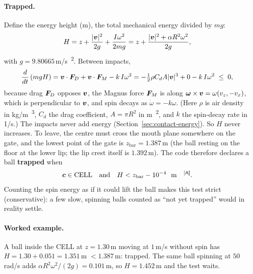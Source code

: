 \paragraph{Trapped.}
Define the energy height (\unit{m}), the total mechanical energy divided by $mg$:
\begin{equation}
  H = z + \frac{|\bm{v}|^2}{2g} + \frac{I\omega^2}{2mg}
    = z + \frac{|\bm{v}|^2 + \alpha R^2\omega^2}{2g},
  \label{eq:contact-energy-height}
\end{equation}
with $g=9.80665$\,\unit{m/s\textsuperscript{2}}\confirmed. Between impacts,
\begin{equation}
  \frac{d}{dt}\left(mgH\right)
  = \bm{v}\cdot\bm{F}_D + \bm{v}\cdot\bm{F}_M - k\,I\omega^2
  = -\tfrac12\rho C_d A|\bm{v}|^3 + 0 - k\,I\omega^2 \;\le\; 0,
  \label{eq:contact-dEdt}
\end{equation}
because drag $\bm{F}_D$ opposes $\bm{v}$, the Magnus force $\bm{F}_M$ is along
$\bm{\omega}\times\bm{v}=\omega(v_z,-v_x)$, which is perpendicular to $\bm{v}$, and spin
decays as $\dot\omega=-k\omega$. (Here $\rho$ is air density in \unit{kg/m\textsuperscript{3}},
$C_d$ the drag coefficient, $A=\pi R^2$ in \unit{m\textsuperscript{2}}, and $k$ the spin-decay
rate in \unit{1/s}.) The impacts never add energy (Section~\ref{sec:contact-energy}). So $H$
never increases. To leave, the centre must cross the mouth plane somewhere on the gate, and the
lowest point of the gate is $z_{\text{bar}}=1.387$\,\unit{m}\derived{} (the ball resting on the
floor at the lower lip; the lip crest itself is $1.392$\,\unit{m}\derived). The code therefore
declares a ball \textbf{trapped} when
\begin{equation}
  \vect{c}\in\text{CELL}
  \quad\text{and}\quad
  H < z_{\text{bar}} - 10^{-4}\ \text{\unit{m}\assumed}.
  \label{eq:contact-trapped}
\end{equation}
Counting the spin energy as if it could lift the ball makes this test strict (conservative): a
few slow, spinning balls counted as ``not yet trapped'' would in reality settle.

\paragraph{Worked example.}
A ball inside the CELL at $z=1.30$\,\unit{m}\assumed{} moving at $1$\,\unit{m/s}\assumed{}
without spin has $H=1.30+0.051=1.351$\,\unit{m}\derived{} $<1.387$\,\unit{m}\derived: trapped.
The same ball spinning at $50$\,\unit{rad/s}\assumed{} adds
$\alpha R^2\omega^2/(2g)=0.101$\,\unit{m}\derived, so $H=1.452$\,\unit{m}\derived{} and the
test waits.

